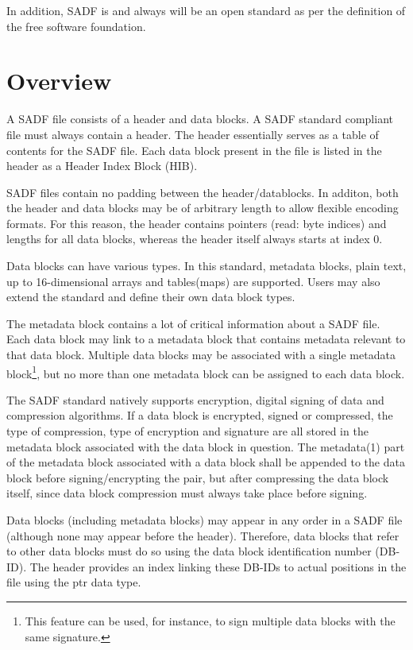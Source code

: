 \documentclass[pagesize=a4]{tufte-book}
\begin{document}
In addition, SADF is and always will be an open standard as per the definition of the free software foundation.

\section{Overview}
A SADF file consists of a header and data blocks. A SADF standard compliant file must always contain a header. The header essentially serves as a table of contents for the SADF file. Each data block present in the file is listed in the header as a Header Index Block (HIB).

SADF files contain no padding between the header/datablocks. In additon, both the header and data blocks may be of arbitrary length to allow flexible encoding formats. For this reason, the header contains pointers (read: byte indices) and lengths for all data blocks, whereas the header itself always starts at index 0.

Data blocks can have various types. In this standard, metadata blocks, plain text, up to 16-dimensional arrays and tables(maps) are supported. Users may also extend the standard and define their own data block types.

The metadata block contains a lot of critical information about a SADF file. Each data block may link to a metadata block that contains metadata relevant to that data block. Multiple data blocks may be associated with a single metadata block\footnote{This feature can be used, for instance, to sign multiple data blocks with the same signature.}, but no more than one metadata block can be assigned to each data block.

The SADF standard natively supports encryption, digital signing of data and compression algorithms. If a data block is encrypted, signed or compressed, the type of compression, type of encryption and signature are all stored in the metadata block associated with the data block in question. The metadata(1) part of the metadata block associated with a data block shall be appended to the data block before signing/encrypting the pair, but after compressing the data block itself, since data block compression must always take place before signing.

Data blocks (including metadata blocks) may appear in any order in a SADF file (although none may appear before the header). Therefore, data blocks that refer to other data blocks must do so using the data block identification number (DB-ID). The header provides an index linking these DB-IDs to actual positions 
in the file using the ptr data type.
\end{document}
